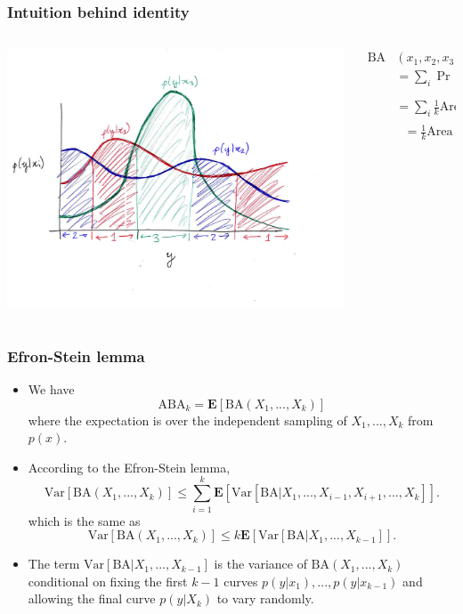 \documentclass{beamer}
\newcommand{\E}{\textbf{E}}
\begin{document}
\begin{frame}
\frametitle{Intuition behind identity}
\begin{columns}
\begin{column}{0.5\textwidth}
\begin{center}
\includegraphics[scale = 0.35, clip = true, trim = 1.2in 1.3in 0in 1in]{var_ba.png}
\end{center}   
\end{column}
\begin{column}{0.5\textwidth}  %
\begin{align*}
\text{BA}&(x_1,x_2,x_3) \\&= \sum_i \Pr[x_i]\Pr_{Y \sim p(y|x_i)}[Y \in \text{zone }i]
\\&= \sum_i \frac{1}{k} \text{Area under curve $i$ in zone $i$}
\\&\ \ \ = \frac{1}{k} \text{Area under } \max_{i=1}^k p(y|x_i)
\end{align*}
\end{column}
\end{columns}
\end{frame}

\begin{frame}
\frametitle{Efron-Stein lemma}
\begin{itemize}
\item We have
\[
\text{ABA}_k = \E[\text{BA}(X_1,...,X_k)]
\]
where the expectation is over the independent sampling of $X_1,...,X_k$ from $p(x)$.
\item According to the Efron-Stein lemma,
\[
\text{Var}[\text{BA}(X_1,...,X_k)] \leq \sum_{i=1}^k \E[\text{Var}[\text{BA}|X_1,...,X_{i-1}, X_{i+1}, ..., X_k]].
\]
which is the same as
\[
\text{Var}[\text{BA}(X_1,...,X_k)] \leq k \E[\text{Var}[\text{BA}|X_1,...,X_{k-1}]].
\]
\item The term $\text{Var}[\text{BA}|X_1,...,X_{k-1}]$ is the variance of $\text{BA}(X_1,...,X_k)$
conditional on fixing the first $k-1$ curves $p(y|x_1),...,p(y|x_{k-1})$ and allowing the final curve $p(y|X_k)$ to vary randomly.
\end{itemize}
\end{frame}
\end{document}
